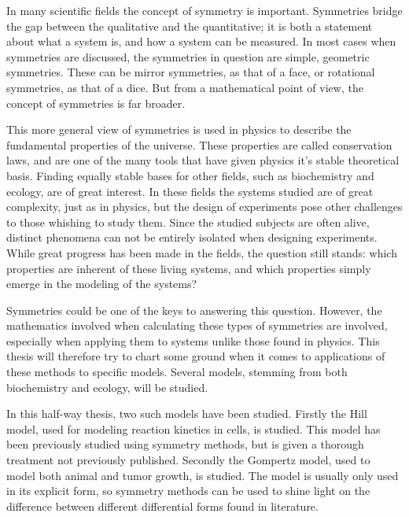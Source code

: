 
In many scientific fields the concept of symmetry is important.
Symmetries bridge the gap between the qualitative and the quantitative; it is both a statement about what a system is, and how a system can be measured.
In most cases when symmetries are discussed, the symmetries in question are simple, geometric symmetries.
These can be mirror symmetries, as that of a face, or rotational symmetries, as that of a dice.
But from a mathematical point of view, the concept of symmetries is far broader.

This more general view of symmetries is used in physics to describe the fundamental properties of the universe.
These properties are called conservation laws, and are one of the many tools that have given physics it's stable theoretical basis.
Finding equally stable bases for other fields, such as biochemistry and ecology, are of great interest.
In these fields the systems studied are of great complexity, just as in physics, but the design of experiments pose other challenges to those whishing to study them.
Since the studied subjects are often alive, distinct phenomena can not be entirely isolated when designing experiments.
While great progress has been made in the fields, the question still stands: which properties are inherent of these living systems, and which properties simply emerge in the modeling of the systems?

Symmetries could be one of the keys to answering this question.
However, the mathematics involved when calculating these types of symmetries are involved, especially when applying them to systems unlike those found in physics.
This thesis will therefore try to chart some ground when it comes to applications of these methods to specific models.
Several models, stemming from both biochemistry and ecology, will be studied.

In this half-way thesis, two such models have been studied.
Firstly the Hill model, used for modeling reaction kinetics in cells, is studied.
This model has been previously studied using symmetry methods, but is given a thorough treatment not previously published.
Secondly the Gompertz model, used to model both animal and tumor growth, is studied.
The model is usually only used in its explicit form, so symmetry methods can be used to shine light on the difference between different differential forms found in literature.
